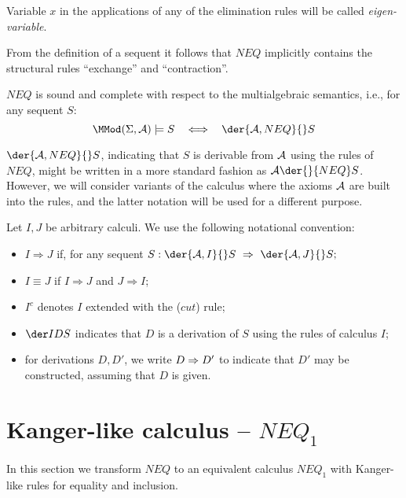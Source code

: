 \noindent
Variable $x$ in the applications of any of the elimination rules will be called
{\em eigen-variable}.
%
\begin{REMARK} \label{re:1}
{From the definition of a sequent it follows that $NEQ$ implicitly contains the 
structural rules ``exchange'' and ``contraction''.}
\end{REMARK}
%
\begin{THEOREM}\label{th:cmpl} {\em \cite{WM}}
$NEQ$ is sound and complete with respect to the multialgebraic semantics, i.e.,
for any sequent $S$:
\[\MMod(\Sigma,\Ax)\models S \ \ \iff \ \ \der{\Ax, NEQ}{}S\]
\end{THEOREM}
\noindent
 $\der{\Ax,NEQ}{}S$,  indicating that $S$ is derivable from ${\cal {A}}$
using the rules of $NEQ$, might be written in a more standard fashion as
 $\Ax\der{}{NEQ}S$. However, we will consider variants of the calculus
 where the axioms ${\cal {A}}$ are built into the rules, and the latter notation will be used
 for a different purpose.

%
\begin{DEFINITION} Let $I, J$ be arbitrary
calculi. We use the following notational convention:
\begin{itemize}\MyLPar
\item $I \Rightarrow J$ if, for any sequent $S : \der{\Ax, I}{}S 
\ \Rightarrow\  \der{\Ax, J}{}S;$
\item $I\equiv J$ if $I\Rightarrow J$ and $J\Rightarrow I$;
\item $I^c$ denotes $I$ extended with the 
($cut$) rule;
\item $\der IDS$ indicates that $D$ is a derivation of $S$ 
using the rules of calculus $I$;
\item for derivations $D, D'$, we write $D\mathrel\Rightarrow D'$ to indicate that $D'$
may be constructed, assuming that $D$ is given.
\end{itemize}
\end{DEFINITION}

\section{Kanger-like calculus -- $NEQ_1$}\label{se:neq1}
In this section we transform $NEQ$ to an equivalent calculus $NEQ_1$ 
with Kanger-like rules for equality \cite{K} and inclusion.

